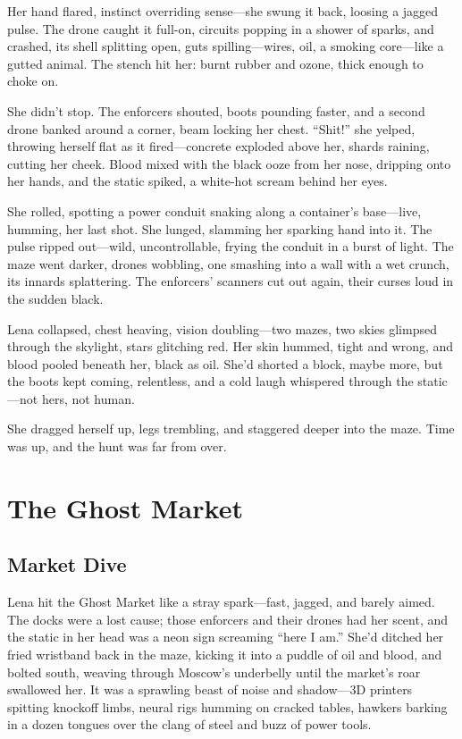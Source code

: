 \documentclass[12pt]{book}
\begin{document}
Her hand flared, instinct overriding sense---she swung it back, loosing a jagged pulse. The drone caught it full-on, circuits popping in a shower of sparks, and crashed, its shell splitting open, guts spilling---wires, oil, a smoking core---like a gutted animal. The stench hit her: burnt rubber and ozone, thick enough to choke on.

She didn’t stop. The enforcers shouted, boots pounding faster, and a second drone banked around a corner, beam locking her chest. ``Shit!'' she yelped, throwing herself flat as it fired---concrete exploded above her, shards raining, cutting her cheek. Blood mixed with the black ooze from her nose, dripping onto her hands, and the static spiked, a white-hot scream behind her eyes.

She rolled, spotting a power conduit snaking along a container’s base---live, humming, her last shot. She lunged, slamming her sparking hand into it. The pulse ripped out---wild, uncontrollable, frying the conduit in a burst of light. The maze went darker, drones wobbling, one smashing into a wall with a wet crunch, its innards splattering. The enforcers’ scanners cut out again, their curses loud in the sudden black.

Lena collapsed, chest heaving, vision doubling---two mazes, two skies glimpsed through the skylight, stars glitching red. Her skin hummed, tight and wrong, and blood pooled beneath her, black as oil. She’d shorted a block, maybe more, but the boots kept coming, relentless, and a cold laugh whispered through the static---not hers, not human.

She dragged herself up, legs trembling, and staggered deeper into the maze. Time was up, and the hunt was far from over.

\chapter{The Ghost Market}
\section{Market Dive}

Lena hit the Ghost Market like a stray spark---fast, jagged, and barely aimed. The docks were a lost cause; those enforcers and their drones had her scent, and the static in her head was a neon sign screaming ``here I am.'' She’d ditched her fried wristband back in the maze, kicking it into a puddle of oil and blood, and bolted south, weaving through Moscow’s underbelly until the market’s roar swallowed her. It was a sprawling beast of noise and shadow---3D printers spitting knockoff limbs, neural rigs humming on cracked tables, hawkers barking in a dozen tongues over the clang of steel and buzz of power tools.
\end{document}

